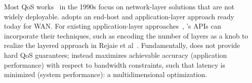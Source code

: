  Most QoS works~\cite{braden1994integrated, ferrari1990scheme,
  shenker1995fundamental} in the 1990s focus on network-layer solutions that are
not widely deployable. \sysname{} adopts an end-host and application-layer
approach ready today for WAN. For existing application-layer
approaches~\cite{vandalore2001survey}, \sysname{}'s APIs can incorporate their
techniques, such as encoding the number of layers as a knob to realize the
layered approach in Rejaie et al~\cite{rejaie2000layered}. Fundamentally,
\sysname{} does not provide hard QoS guarantees; instead \sysname{} maximizes
achievable accuracy (application performance) with respect to bandwidth
constraints, such that latency is minimized (system performance): a
multidimensional optimization.




